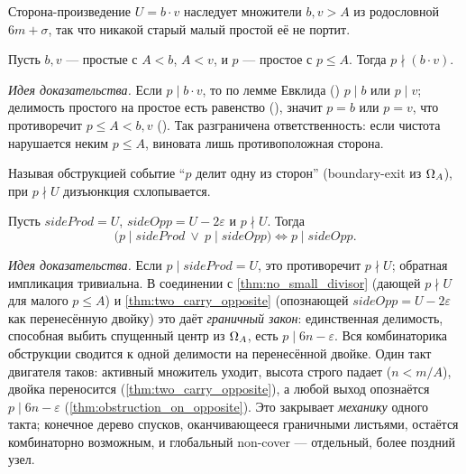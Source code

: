 Сторона-произведение $U=b\cdot v$ наследует множители $b,v>A$ из родословной $6m+\sigma$, так что
никакой старый малый простой её не портит.

\begin{theorem}\label{thm:no_small_divisor}
\green{} Пусть $b,v$ --- простые с $A<b$, $A<v$, и $p$ --- простое с $p\le A$. Тогда
$p\nmid(b\cdot v)$.
\end{theorem}

\emph{Идея доказательства.} Если $p\mid b\cdot v$, то по лемме Евклида ()
$p\mid b$ или $p\mid v$; делимость простого на простое есть равенство
(), значит $p=b$ или $p=v$, что противоречит $p\le A<b,v$
(). Так разграничена ответственность: если чистота нарушается неким $p\le A$, виновата
лишь противоположная сторона.

Называя обструкцией событие ``$p$ делит одну из сторон'' (boundary-exit из $\Omega_A$), при $p\nmid U$
дизъюнкция схлопывается.

\begin{theorem}\label{thm:obstruction_on_opposite}
\green{} Пусть $\mathit{sideProd}=U$, $\mathit{sideOpp}=U-2\varepsilon$ и $p\nmid U$. Тогда
\begin{equation}\label{eq:obstruction}
\bigl(p\mid\mathit{sideProd}\ \lor\ p\mid\mathit{sideOpp}\bigr)\iff p\mid\mathit{sideOpp}.
\end{equation}
\end{theorem}

\emph{Идея доказательства.} Если $p\mid\mathit{sideProd}=U$, это противоречит $p\nmid U$; обратная
импликация тривиальна. В соединении с \cref{thm:no_small_divisor} (дающей $p\nmid U$ для малого
$p\le A$) и \cref{thm:two_carry_opposite} (опознающей $\mathit{sideOpp}=U-2\varepsilon$ как
перенесённую двойку) это даёт \emph{граничный закон}: единственная делимость, способная выбить
спущенный центр из $\Omega_A$, есть $p\mid 6n-\varepsilon$. Вся комбинаторика обструкции сводится к
одной делимости на перенесённой двойке. Один такт двигателя таков: активный множитель уходит,
высота строго падает ($n<m/A$), двойка переносится (\cref{thm:two_carry_opposite}), а любой выход
опознаётся $p\mid 6n-\varepsilon$ (\cref{thm:obstruction_on_opposite}). Это закрывает
\emph{механику} одного такта; конечное дерево спусков, оканчивающееся граничными листьями, остаётся
комбинаторно возможным, и глобальный non-cover --- отдельный, более поздний узел.

